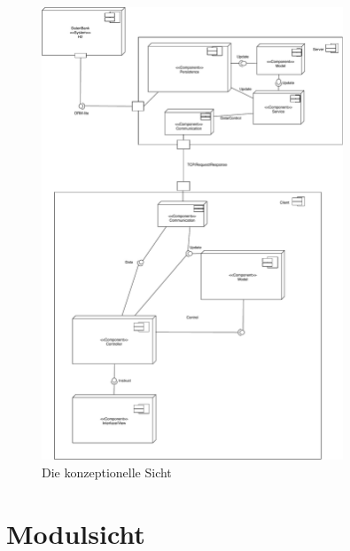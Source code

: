 \documentclass[fontsize=12pt,paper=a4,twoside]{scrartcl}
\begin{document}
\begin{figure}[H]
\begin{center}
  \includegraphics[width=340px]{UML/KonzeptionelleSicht.pdf}
  \caption{Die konzeptionelle Sicht}
  \label{fig:boat1}
\end{center}
\end{figure}


\section{Modulsicht} \label{sec:modulsicht}
\end{document}
